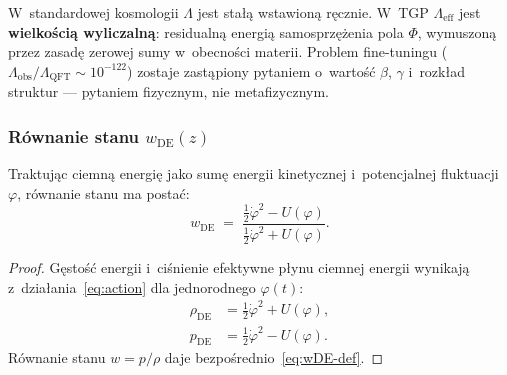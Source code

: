 \begin{remark}\label{rem:Lambda-nie-param}
W~standardowej kosmologii $\Lambda$ jest sta\l{}\k{a}
wstawion\k{a} r\k{e}cznie.
W~TGP $\Lambda_{\mathrm{eff}}$ jest \textbf{wielko\'sci\k{a} wyliczaln\k{a}}:
residualn\k{a} energi\k{a} samosprz\k{e}\.zenia pola $\Phi$,
wymuszon\k{a} przez zasad\k{e} zerowej sumy w~obecno\'sci materii.
Problem fine-tuningu ($\Lambda_{\mathrm{obs}}/\Lambda_{\mathrm{QFT}}
\sim 10^{-122}$) zostaje zast\k{a}piony pytaniem o~warto\'s\'c
$\beta$, $\gamma$ i~rozk\l{}ad struktur --- pytaniem
fizycznym, nie metafizycznym.
\end{remark}

\subsubsection{R\'ownanie stanu $w_{\mathrm{DE}}(z)$}

\begin{proposition}\label{prop:wDE}
Traktuj\k{a}c ciemn\k{a} energi\k{e} jako sum\k{e} energii
kinetycznej i~potencjalnej fluktuacji $\varphi$, r\'ownanie stanu
ma posta\'c:
\begin{equation}\label{eq:wDE-def}
  \boxed{
    w_{\mathrm{DE}}
    \;=\; \frac{\frac{1}{2}\dot{\varphi}^2 - U(\varphi)}
               {\frac{1}{2}\dot{\varphi}^2 + U(\varphi)}.
  }
\end{equation}
\end{proposition}

\begin{proof}
G\k{e}sto\'s\'c energii i~ci\'snienie efektywne p\l{}ynu ciemnej
energii wynikaj\k{a} z~dzia\l{}ania~\eqref{eq:action} dla
jednorodnego $\varphi(t)$:
\begin{align}
    \rho_{\mathrm{DE}} &= \tfrac{1}{2}\dot{\varphi}^2 + U(\varphi),
    \label{eq:rhoDE} \\
    p_{\mathrm{DE}} &= \tfrac{1}{2}\dot{\varphi}^2 - U(\varphi).
    \label{eq:pDE}
\end{align}
R\'ownanie stanu $w = p/\rho$ daje
bezpo\'srednio~\eqref{eq:wDE-def}.
\end{proof}

